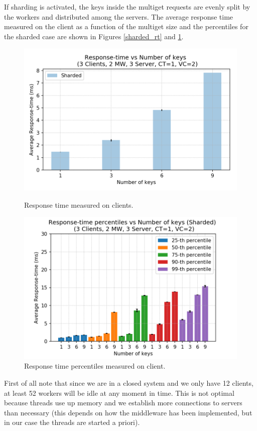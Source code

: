 If sharding is activated, the keys inside the multiget requests are evenly split by the workers and distributed among the servers.
The average response time measured on the client as a function of the multiget size and the percentiles for the sharded case are shown in Figures \ref{sharded_rt} and \ref{sharded_percentiles}.
\begin{figure}[H]
   \begin{minipage}{0.48\textwidth}
     \centering
     \includegraphics[width=1\linewidth]{figures/4_GetsAndMultigets/mem_rt_sharded_2018-11-22_18h12.png}
     \caption{Response time measured on clients.}\label{sharded_rt}
   \end{minipage}\hfill
   \begin{minipage}{0.48\textwidth}
     \centering
     \includegraphics[width=1\linewidth]{figures/4_GetsAndMultigets/mem_perc_sharded_2018-11-22_18h12.png}
     \caption{Response time percentiles measured on client.}\label{sharded_percentiles}
   \end{minipage}
\end{figure}
First of all note that since we are in a closed system and we only have 12 clients, at least 52 workers will be idle at any moment in time. This is not optimal because threads use up memory and we establish more connections to servers than necessary (this depends on how the middleware has been implemented, but in our case the threads are started a priori). 

